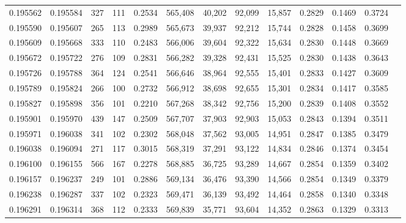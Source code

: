 \begin{tabular}{rrrrrrrrrrrrr}
0.195562 & 0.195584 &   327 & 111 &                                     0.2534 & 565,408 &  40,202 &  92,099 &  15,857 & 0.2829 & 0.1469 & 0.3724 \\
0.195590 & 0.195607 &   265 & 113 &                                     0.2989 & 565,673 &  39,937 &  92,212 &  15,744 & 0.2828 & 0.1458 & 0.3699 \\
0.195609 & 0.195668 &   333 & 110 &                                     0.2483 & 566,006 &  39,604 &  92,322 &  15,634 & 0.2830 & 0.1448 & 0.3669 \\
0.195672 & 0.195722 &   276 & 109 &                                     0.2831 & 566,282 &  39,328 &  92,431 &  15,525 & 0.2830 & 0.1438 & 0.3643 \\
0.195726 & 0.195788 &   364 & 124 &                                     0.2541 & 566,646 &  38,964 &  92,555 &  15,401 & 0.2833 & 0.1427 & 0.3609 \\
0.195789 & 0.195824 &   266 & 100 &                                     0.2732 & 566,912 &  38,698 &  92,655 &  15,301 & 0.2834 & 0.1417 & 0.3585 \\
0.195827 & 0.195898 &   356 & 101 &                                     0.2210 & 567,268 &  38,342 &  92,756 &  15,200 & 0.2839 & 0.1408 & 0.3552 \\
0.195901 & 0.195970 &   439 & 147 &                                     0.2509 & 567,707 &  37,903 &  92,903 &  15,053 & 0.2843 & 0.1394 & 0.3511 \\
0.195971 & 0.196038 &   341 & 102 &                                     0.2302 & 568,048 &  37,562 &  93,005 &  14,951 & 0.2847 & 0.1385 & 0.3479 \\
0.196038 & 0.196094 &   271 & 117 &                                     0.3015 & 568,319 &  37,291 &  93,122 &  14,834 & 0.2846 & 0.1374 & 0.3454 \\
0.196100 & 0.196155 &   566 & 167 &                                     0.2278 & 568,885 &  36,725 &  93,289 &  14,667 & 0.2854 & 0.1359 & 0.3402 \\
0.196157 & 0.196237 &   249 & 101 &                                     0.2886 & 569,134 &  36,476 &  93,390 &  14,566 & 0.2854 & 0.1349 & 0.3379 \\
0.196238 & 0.196287 &   337 & 102 &                                     0.2323 & 569,471 &  36,139 &  93,492 &  14,464 & 0.2858 & 0.1340 & 0.3348 \\
0.196291 & 0.196314 &   368 & 112 &                                     0.2333 & 569,839 &  35,771 &  93,604 &  14,352 & 0.2863 & 0.1329 & 0.3313 \\

\end{tabular}
